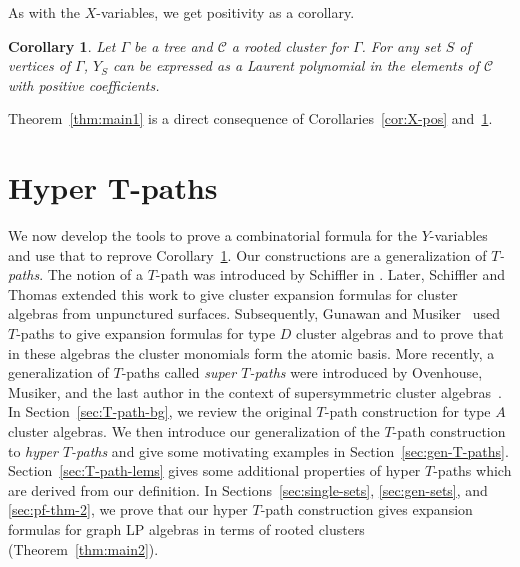 \documentclass[10pt,a4paper]{amsart}
\numberwithin{equation}{section}
\newtheorem{Corollary}[Theorem]{Corollary}
\begin{document}
As with the $X$-variables, we get positivity as a corollary.
\begin{Corollary}\label{cor:Y-pos}
Let $\Gamma$ be a tree and $\mathcal{C}$ a rooted cluster for $\Gamma$. For any set $S$ of vertices of $\Gamma$, $Y_S$ can be expressed as a Laurent polynomial in the elements of $\mathcal{C}$ with positive coefficients.
\end{Corollary}
Theorem~\ref{thm:main1} is a direct consequence of Corollaries~\ref{cor:X-pos} and~\ref{cor:Y-pos}.

\section[Hyper T-paths]{Hyper $\boldsymbol{T}$-paths}\label{sec:T-path}
We now develop the tools to prove a combinatorial formula for the $Y$-variables and use that to reprove Corollary~\ref{cor:Y-pos}. Our constructions are a generalization of \emph{$T$-paths}.
The notion of a $T$-path was introduced by Schiffler in \cite{S-08}. Later, Schiffler and Thomas \cite{S-10, ST-09} extended this work to give cluster expansion formulas for cluster algebras from unpunctured surfaces. Subsequently, Gunawan and Musiker~\cite{GM-15} used $T$-paths to give expansion formulas for type $D$ cluster algebras and to prove that in these algebras the cluster monomials form the atomic basis. More recently, a generalization of $T$-paths called \emph{super $T$-paths} were introduced by Ovenhouse, Musiker, and the last author in the context of supersymmetric cluster algebras~\cite{MOZ-21}.
In Section~\ref{sec:T-path-bg}, we review the original $T$-path construction for type $A$ cluster algebras. We then introduce our generalization of the $T$-path construction to \emph{hyper $T$-paths}
and give some motivating examples in Section~\ref{sec:gen-T-paths}. Section~\ref{sec:T-path-lems} gives some additional properties of hyper $T$-paths which are derived from our definition. In Sections~\ref{sec:single-sets}, \ref{sec:gen-sets}, and \ref{sec:pf-thm-2}, we prove that our hyper $T$-path construction gives expansion formulas for graph LP algebras in terms of rooted clusters (Theorem~\ref{thm:main2}).
\end{document}
